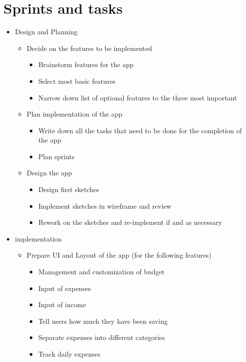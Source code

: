 \section{Sprints and tasks}
\begin{itemize}
  \item Design and Planning
  \begin{itemize}
    \item Decide on the features to be implemented
    \begin{itemize}
      \item Brainstorm features for the app
      \item Select most basic features
      \item Narrow down list of optional features to the three most important
    \end{itemize}
    \item Plan implementation of the app
    \begin{itemize}
      \item Write down all the tasks that need to be done for the completion of the app
      \item Plan sprints
    \end{itemize}
    \item Design the app
    \begin{itemize}
      \item Design first sketches
      \item Implement sketches in wireframe and review
      \item Rework on the sketches and re-implement if and as necessary
    \end{itemize}
  \end{itemize}
  \item implementation
  \begin{itemize}
    \item Prepare UI and Layout of the app (for the following features)
    \begin{itemize}
      \item Management and customization of budget
      \item Input of expenses
      \item Input of income
      \item Tell users how much they have been saving
      \item Separate expenses into different categories
      \item Track daily expenses
    \end{itemize}

\end{itemize}
\end{itemize}
